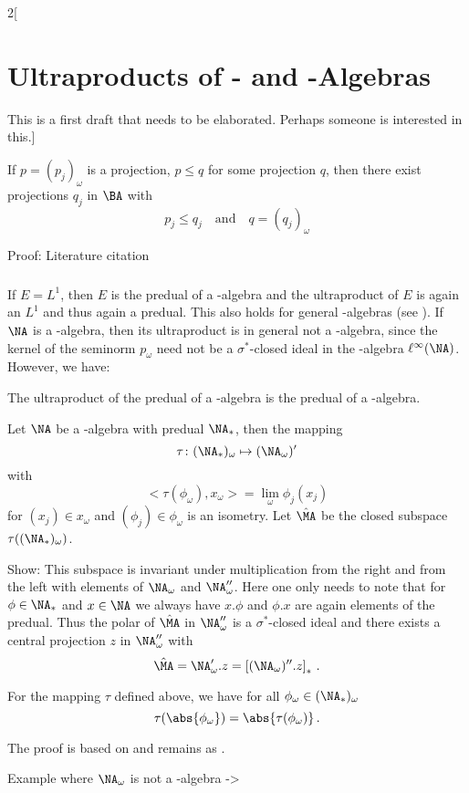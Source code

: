 \documentclass[%
	,english 
	,headings	= small 
	,leqno
	,parskip		= half+
	,DIV			= 14
	,BCOR 			= 10mm	
		]{scrartcl}
\begin{document}
\begin{multicols}{2}[%
\section*{Ultraproducts of \CA- and \WA-Algebras}
This is a first draft that needs to be elaborated. Perhaps someone is interested in this.]
\begin{proposition}
\begin{myenumerate}
	\item
	If $ p = ( p_{ j } )_{ \omega } $ is a projection, $ p \leq q $ for some projection $ q $, then there exist projections $ q_{ j } $ in $ \BA $ with  
\[
    p_{ j } \leq q_{ j }
    \quad \text{and} \quad
    q = ( q_{ j } )_{ \omega }
\]
%
\end{myenumerate}
%
\end{proposition}
%
Proof: Literature citation
\subsubsection{}
If $ E = L^{ 1 } $, then $ E $ is the predual of a \WA-algebra and the ultraproduct of $ E $ is again an $ L^{ 1 } $ and thus again a predual.
This also holds for general \WA-algebras (see \textcite{ulgr-optheory11}).
If $ \NA $ is a \WA-algebra, then its ultraproduct is in general not a \WA-algebra, since the kernel of the seminorm $ p_{ \omega } $ need not be a $ \sigma^{ * } $-closed ideal in the \WA-algebra $ \ell^{ \infty }( \NA ) $.
However, we have:
%
\begin{proposition}
The ultraproduct of the predual of a \WA-algebra is the predual of a \WA-algebra.
\end{proposition}
%
Let $ \NA $ be a \WA-algebra with predual $ \NA_{ * } $, then the mapping
%
\[
    \tau \colon ( \NA_{ * } )_{ \omega } \mapsto ( \NA_{ \omega } ){}'
\]
%
with
%
\[
    < \tau( \phi_{ \omega } ) , x_{ \omega } > = \lim_{ \omega } \phi_{ j }( x_{ j } )
\]
%
for $ ( x_{ j } ) \in x_{ \omega } $ and $ ( \phi_{ j } ) \in \phi_{ \omega } $ is an isometry.
Let $ \hat{\MA} $ be the closed subspace $ \tau ( ( \NA_{ * } )_{ \omega } ) $. 

Show: This subspace is invariant under multiplication from the right and from the left with elements of $ \NA_{ \omega } $ and $ \NA_{ \omega }'' $. 
Here one only needs to note that for $ \phi \in \NA_{ * } $ and $ x \in \NA $ we always have $ x . \phi $ and $ \phi . x $ are again elements of the predual.
Thus the polar of $ \hat{\MA} $ in $ \NA_{ \omega }'' $ is a $ \sigma^{ * } $-closed ideal and there exists a central projection $ z $ in $ \NA_{ \omega }'' $ with
%
\[
    \hat{ \MA } = \NA_{ \omega }' . z = \left[ ( \NA_{ \omega } ){}'' . z \right]_{ * } \, .
\]
%
\begin{proposition}
For the mapping $ \tau $ defined above, we have for all $ \phi_{ \omega } \in ( \NA_{ * } )_{ \omega } $
%
\[
    \tau ( \abs{ \phi_{ \omega } } ) = \abs{ \tau( \phi_{ \omega } ) } \, .
\]
%
\end{proposition}
The proof is based on \textcite[III.4.10]{takesaki:1979} and remains as .
%
\begin{example}
Example where $ \NA_{ \omega } $ is not a \WA-algebra ->
\end{example}
%

\end{multicols}
\end{document}
